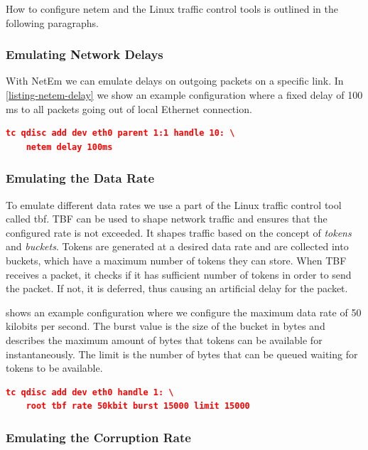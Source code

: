 How to configure \gls{netem} and the Linux traffic control tools is outlined in
the following paragraphs.

\subsubsection{Emulating Network Delays}

With NetEm we can emulate delays on outgoing packets on a specific link. In
\cref{listing-netem-delay} we show an example configuration where a fixed delay
of 100 ms to all packets going out of local Ethernet connection.

\begin{lstlisting}[frame=single, language=json, caption="Emulating the delay of outgoing packets", label=listing-netem-delay]
  tc qdisc add dev eth0 parent 1:1 handle 10: \
    netem delay 100ms
\end{lstlisting}

\subsubsection{Emulating the Data Rate}

To emulate different data rates we use a part of the Linux traffic control tool
called \gls{tbf}. TBF can be used to shape network traffic and ensures that the
configured rate is not exceeded. It shapes traffic based on the concept of
\textit{tokens} and \textit{buckets}. Tokens are generated at a desired data
rate and are collected into buckets, which have a maximum number of tokens they
can store. When TBF receives a packet, it checks if it has sufficient number of
tokens in order to send the packet. If not, it is deferred, thus causing an
artificial delay for the packet.

 shows an example configuration where we configure
the maximum data rate of 50 kilobits per second. The burst value is the size of
the bucket in bytes and describes the maximum amount of bytes that tokens can be
available for instantaneously. The limit is the number of bytes that can be queued
waiting for tokens to be available.

\begin{lstlisting}[frame=single, language=json, caption="Emulating the data rate", label=listing-netem-data-rate]
  tc qdisc add dev eth0 handle 1: \
    root tbf rate 50kbit burst 15000 limit 15000
\end{lstlisting}

\subsubsection{Emulating the Corruption Rate}

